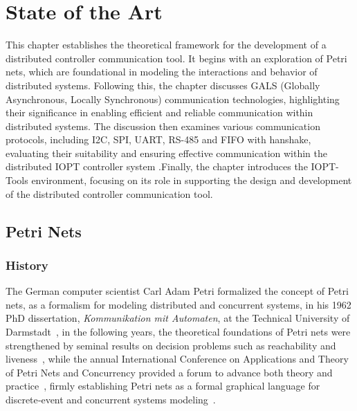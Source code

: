 
%

\chapter{State of the Art}
\label{cha:state_of_the_ art}


\epigraphfontsize{\small\itshape}
\setlength\epigraphwidth{12.5cm}
\setlength\epigraphrule{0pt}

This chapter establishes the theoretical framework for the development of a distributed controller communication tool. It begins with an exploration of Petri nets, which are foundational in modeling the interactions and behavior of distributed systems. Following this, the chapter discusses GALS (Globally Asynchronous, Locally Synchronous) communication technologies, highlighting their significance in enabling efficient and reliable communication within distributed systems. The discussion then examines various communication protocols, including I2C, SPI, UART, RS-485 and FIFO with hanshake, evaluating their suitability and ensuring effective communication within the distributed IOPT controller system .Finally, the chapter introduces the IOPT-Tools environment, focusing on its role in supporting the design and development of the distributed controller communication tool.

\section{Petri Nets}
\label{sec:petri_nets}


\subsection{History}
\label{subsec:history}
The German computer scientist Carl Adam Petri formalized the concept of  Petri nets, as a formalism for modeling distributed and concurrent systems, in his 1962 PhD dissertation, \emph{Kommunikation mit Automaten}, at the Technical University of Darmstadt~\cite{petri1962}, in the following years, the theoretical foundations of Petri nets were strengthened by seminal results on decision problems such as reachability and liveness~\cite{murata}, while the annual International Conference on Applications and Theory of Petri Nets and Concurrency provided a forum to advance both theory and practice~\cite{ICPN1980}, firmly establishing Petri nets as a formal graphical language for discrete‐event and concurrent systems modeling~\cite{WikiPetriNet2025}.


